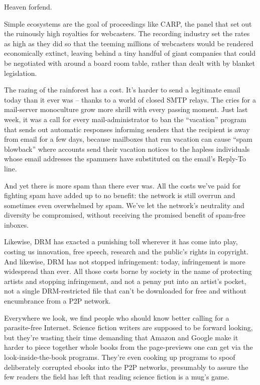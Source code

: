 Heaven forfend.

Simple ecosystems are the goal of proceedings like CARP, the panel
that set out the ruinously high royalties for webcasters. The
recording industry set the rates as high as they did so that the
teeming millions of webcasters would be rendered economically
extinct, leaving behind a tiny handful of giant companies that
could be negotiated with around a board room table, rather than
dealt with by blanket legislation.

The razing of the rainforest has a cost. It's harder to send a
legitimate email today than it ever was -- thanks to a world of
closed SMTP relays. The cries for a mail-server monoculture grow
more shrill with every passing moment. Just last week, it was a
call for every mail-administrator to ban the ``vacation'' program
that sends out automatic responses informing senders that the
recipient is away from email for a few days, because mailboxes that
run vacation can cause ``spam blowback'' where accounts send their
vacation notices to the hapless individuals whose email addresses
the spammers have substituted on the email's Reply-To line.

And yet there is more spam than there ever was. All the costs we've
paid for fighting spam have added up to no benefit: the network is
still overrun and sometimes even overwhelmed by spam. We've let the
network's neutrality and diversity be compromised, without
receiving the promised benefit of spam-free inboxes.

Likewise, DRM has exacted a punishing toll wherever it has come
into play, costing us innovation, free speech, research and the
public's rights in copyright. And likewise, DRM has not stopped
infringement: today, infringement is more widespread than ever. All
those costs borne by society in the name of protecting artists and
stopping infringement, and not a penny put into an artist's pocket,
not a single DRM-restricted file that can't be downloaded for free
and without encumbrance from a P2P network.

Everywhere we look, we find people who should know better calling
for a parasite-free Internet. Science fiction writers are supposed
to be forward looking, but they're wasting their time demanding
that Amazon and Google make it harder to piece together whole books
from the page-previews one can get via the look-inside-the-book
programs. They're even cooking up programs to spoof deliberately
corrupted ebooks into the P2P networks, presumably to assure the
few readers the field has left that reading science fiction is a
mug's game.

